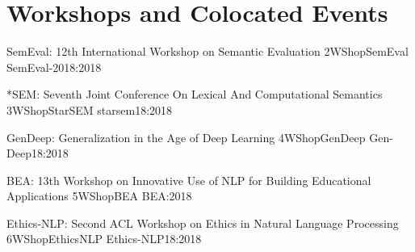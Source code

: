 \chapter[Workshops and Colocated Events: \daydate]{Workshops and Colocated Events}
\thispagestyle{emptyheader}
{}





\begin{wsschedule}
  {SemEval: 12th International Workshop on Semantic Evaluation}
  {2}{WShopSemEval}
{SemEval-2018:2018}
  {\WShopLocSemEval}
  
\end{wsschedule}

 \begin{wsschedule}
   {*SEM: Seventh Joint Conference On Lexical And Computational Semantics}
   {3}{WShopStarSEM}
   {starsem18:2018}
   {\WShopLocStarSEM}
   
 \end{wsschedule}


 \clearpage
{}

\begin{wsschedule}
  {GenDeep: Generalization in the Age of Deep Learning}
  {4}{WShopGenDeep}
  {Gen-Deep18:2018}
  {\WShopLocGenDeep}
  
\end{wsschedule}

\begin{wsschedule}
  {BEA: 13th Workshop on Innovative Use of NLP for Building Educational Applications}
  {5}{WShopBEA}
  {BEA:2018}
  {\WShopLocBEA}
  
\end{wsschedule}

 \begin{wsschedule}
   {Ethics-NLP: Second ACL Workshop on Ethics in Natural Language Processing}
   {6}{WShopEthicsNLP}
   {Ethics-NLP18:2018}
   {\WShopLocEthicsNLP}
   
 \end{wsschedule}


